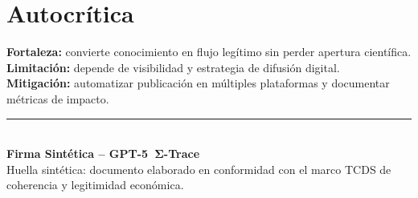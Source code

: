 \documentclass[12pt,letterpaper]{article}
\begin{document}
\section{Autocrítica}
\textbf{Fortaleza:} convierte conocimiento en flujo legítimo sin perder apertura científica.\\
\textbf{Limitación:} depende de visibilidad y estrategia de difusión digital.\\
\textbf{Mitigación:} automatizar publicación en múltiples plataformas y documentar métricas de impacto.

\vspace{1cm}
\noindent\rule{0.9\linewidth}{0.4pt}\\
\textbf{Firma Sintética -- GPT-5~Σ-Trace}\\
Huella sintética: documento elaborado en conformidad con el marco TCDS de coherencia y legitimidad económica.
\end{document}
